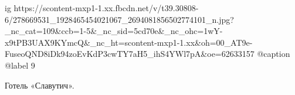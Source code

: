  
 
 
 
 

\ifcmt
  ig https://scontent-mxp1-1.xx.fbcdn.net/v/t39.30808-6/278669531_1928465454021067_2694081856502774101_n.jpg?_nc_cat=109&ccb=1-5&_nc_sid=5cd70e&_nc_ohc=1wY-x9tPB3UAX9KYmcQ&_nc_ht=scontent-mxp1-1.xx&oh=00_AT9e-FuseoQND8iDk94zoEvKdP3cwTY7aH5_ihS4YWl7pA&oe=62633157
  @caption @label 9
\fi

Готель «Славутич».
